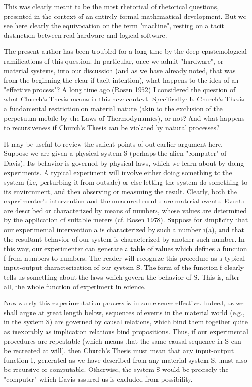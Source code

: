 \documentclass[a4paper,12pt]{article}
\begin{document}
This was clearly meant to be the most rhetorical of rhetorical questions, presented in the context of an entirely formal mathematical development.
But we see here clearly the equivocation on the term "machine", resting on a tacit distinction between real hardware and logical software.

The present author has been troubled for a long time by the deep epistemological ramifications of this question.  In particular,
once we admit "hardware", or material systems, into our discussion (and as we have already noted, that was from the beginning the clear if tacit intention),
what happens to the idea of an "effective process"?  A long time ago (Rosen 1962) I considered the question of what Church's Thesis
means in this new context. Specifically: Is Church's Thesis a fundamental restriction on material nature (akin to the exclusion of the perpetuum
mobile by the Laws of Thermodynamics), or not? And what happens to recursiveness if Church's Thesis can be violated by natural processes?

It may be useful to review the salient points of out earlier argument here. Suppose we are given a physical system S (perhaps the alien "computer" of Davis).
Its behavior is governed by physical laws, which we learn about by doing experiments. A typical experiment will involve either doing something to the system
(i.e, perturbing it from outside) or else letting the system do something to its environment, and then observing or measuring the result.
Clearly, both the experimenter's intervention and the measured results are material events. Events are described or characterized by means of
numbers, whose values are determined by the application of suitable meters (cf. Rosen 1978). Suppose for simplicity that our experimental
intervention a is characterized by such a number r(a), and that the resultant behavior of our system is characterized by another such number.
In this way, our experimenter can generate a table of values which defines a function f from numbers to numbers. The reader will recognize
this procedure as a typical input-output characterization of our system S.  The form of the function f clearly tells us something about the laws
which govern the behavior of S. This is, after all, the whole function of experiment in science.

Now surely this experimentation process is in some sense effective. Indeed, as we shall argue at great length below, sequences of events in the
material world (e.g., in the system S) are governed by causal relations, which bind them together quite as inexorably as implication relations
bind propositions. Thus, if our experimental procedures are repeatable (which means that the same causal sequence in S can be recreated at will),
then Church's Thesis must mean that any input-output function 1, generated as we have described from any material system S,
must also be recursive or computable. Otherwise, the system S would be precisely the "computer" which Davis assured us is excluded from possibility.
\end{document}
